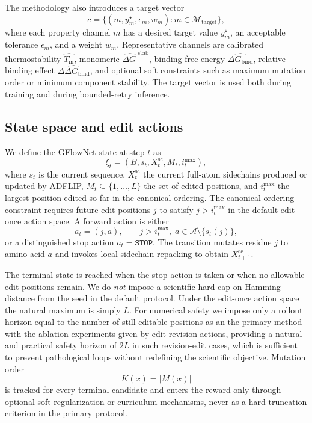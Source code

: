 \documentclass[11pt]{article}
\newcommand{\dG}{\ensuremath{\Delta G \ }}
\newcommand{\Tm}{\ensuremath{T_{\mathrm m}}}
\newcommand{\ddGbind}{\ensuremath{\Delta\Delta G_{\mathrm{bind}}}}
\newcommand{\dGbind}{\ensuremath{\Delta G_{\mathrm{bind}}}}
\newcommand{\Aset}{\mathcal{A}}
\begin{document}
The methodology also introduces a target vector
\begin{equation}
    c = \{(m,y_m^{\star},\epsilon_m,w_m): m\in\mathcal{M}_{\mathrm{target}}\},
\end{equation}
where each property channel $m$ has a desired target value $y_m^{\star}$, an acceptable tolerance $\epsilon_m$, and a weight $w_m$. Representative channels are calibrated thermostability $\widehat{\Tm}$, monomeric $\widehat{\dG}^{\mathrm{stab}}$, binding free energy $\widehat{\dGbind}$, relative binding effect $\widehat{\ddGbind}$, and optional soft constraints such as maximum mutation order or minimum component stability. The target vector is used both during training and during bounded-retry inference.

\subsection{State space and edit actions}

We define the GFlowNet state at step $t$ as
\begin{equation}
    \xi_t = (B, s_t, X_t^{\mathrm{sc}}, M_t, i_t^{\max}),
\end{equation}
where $s_t$ is the current sequence, $X_t^{\mathrm{sc}}$ the current full-atom sidechains produced or updated by ADFLIP, $M_t\subseteq\{1,\ldots,L\}$ the set of edited positions, and $i_t^{\max}$ the largest position edited so far in the canonical ordering. The canonical ordering constraint requires future edit positions $j$ to satisfy $j>i_t^{\max}$ in the default edit-once action space. A forward action is either
\begin{equation}
    a_t=(j,a),\qquad j>i_t^{\max},\; a\in\Aset\setminus\{s_t(j)\},
\end{equation}
or a distinguished stop action $a_t=\mathtt{STOP}$. The transition mutates residue $j$ to amino-acid $a$ and invokes local sidechain repacking to obtain $X^{\mathrm{sc}}_{t+1}$.

The terminal state is reached when the stop action is taken or when no allowable edit positions remain. We do \emph{not} impose a scientific hard cap on Hamming distance from the seed in the default protocol. Under the edit-once action space the natural maximum is simply $L$. For numerical safety we impose only a rollout horizon equal to the number of still-editable positions as an the primary method with the ablation experiments given by edit-revision actions, providing a natural and practical safety horizon of $2L$ in such revision-edit cases, which is sufficient to prevent pathological loops without redefining the scientific objective. Mutation order
\begin{equation}
K(x)=|M(x)|
\end{equation}
is tracked for every terminal candidate and enters the reward only through optional soft regularization or curriculum mechanisms, never as a hard truncation criterion in the primary protocol.
\end{document}
